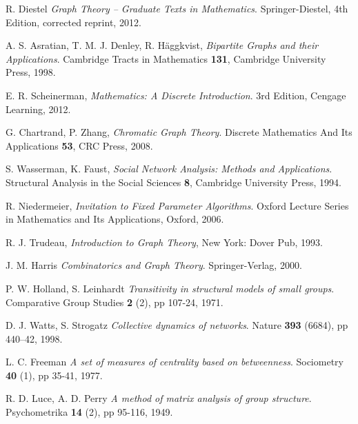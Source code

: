 \cleardoublepage
{}
{}
\begin{thebibliography}{99}

    R. Diestel
    \emph{Graph Theory -- Graduate Texts in Mathematics}.
    Springer-Diestel,
    4th Edition, corrected reprint,
    2012.

  A. S. Asratian, T. M. J. Denley, R. Häggkvist,
  \emph{Bipartite Graphs and their Applications}.
  Cambridge Tracts in Mathematics \textbf{131},
  Cambridge University Press,
  1998.

  E. R. Scheinerman, 
  \emph{Mathematics: A Discrete Introduction}.
  3rd Edition,
  Cengage Learning,
  2012.

  G. Chartrand, P. Zhang,
  \emph{Chromatic Graph Theory}.
  Discrete Mathematics And Its Applications \textbf{53},
  CRC Press,
  2008.

  S. Wasserman, K. Faust,
  \emph{Social Network Analysis: Methods and Applications}.
  Structural Analysis in the Social Sciences \textbf{8},
  Cambridge University Press,
  1994.

  R. Niedermeier,
  \emph{Invitation to Fixed Parameter Algorithms}.
  Oxford Lecture Series in Mathematics and Its Applications,
  Oxford,
  2006.

  R. J. Trudeau,
  \emph{Introduction to Graph Theory},
  New York: Dover Pub,
  1993.

  J. M. Harris
  \emph{Combinatorics and Graph Theory}.
  Springer-Verlag,
  2000.
  
  P. W. Holland, S. Leinhardt
  \emph{Transitivity in structural models of small groups}.
  Comparative Group Studies \textbf{2} (2), pp 107-24,
  1971.

  D. J. Watts, S. Strogatz
  \emph{Collective dynamics of  networks}.
  Nature \textbf{393} (6684), pp 440–42,
  1998.
  
  L. C. Freeman
  \emph{A set of measures of centrality based on betweenness}.
  Sociometry \textbf{40} (1), pp 35-41,
  1977.

  R. D. Luce, A. D. Perry
  \emph{A method of matrix analysis of group structure}.
  Psychometrika \textbf{14} (2), pp 95-116,
  1949.


\end{thebibliography}
